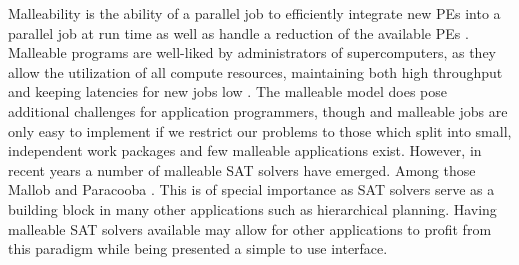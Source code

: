 \documentclass[enabledeprecatedfontcommands,12pt,a4paper,twoside]{scrartcl}
\numberwithin{equation}{section}
\begin{document}
\begin{comment}
- hierarchical planning is popular
- domain-independent automated planning
- decompose a set of initial tasks until they have been decomposed to the level of simple actions
- these actions form a plan which achieve the initial tasks
- TOHTN planning is a sub-problem of HTN planning where all tasks are constrained by a total order

- hierarchical planners are easy to use
- hierarchy allows the user to insert structure into the problem and advise the planner
- hierarchical planning is used in a number of domains
- \cite{munoz2004role} real-time strategy games\\
- \cite{ontanon2015adversarial} improve minimax game tree search in RTS, reduce branching factor
- \cite{lin2020htn} also takes the opponent's strategy into account

- \cite{sirin2004htn} web service composition
- \cite{georgievski2017cloud} cloud application composition

- \cite{gonzalez2017three} socially assistive robotics
- \cite{padia2018yarn} storyline visualizations
- \cite{mohr2018ml} automated machine learning

- hierarchical planning is expensive \cite{erol1994htn}
- HTN is semi-decidable, TOHTN is in D-EXPTIME, EXPSPACE-hard \cite{erol1996complexity}
- there is a correspondence between TOHTN and context free languages \cite{holler2014language}
- hierarchical problems can be recursive which makes the detection of duplicate states important
\end{comment}

Malleability is the ability of a parallel job to efficiently integrate new PEs into a parallel job at run time as well as handle a reduction of the available PEs \cite{feitelson1997job}. Malleable programs are well-liked by administrators of supercomputers, as they allow the utilization of all compute resources, maintaining both high throughput and keeping latencies for new jobs low \cite{feitelson1997job, hungershofer2004combined}. The malleable model does pose additional challenges for application programmers, though and malleable jobs are only easy to implement if we restrict our problems to those which split into small, independent work packages \cite{feitelson1997job, tucker1989process} and few malleable applications exist. 
However, in recent years a number of malleable SAT solvers have emerged. Among those Mallob \cite{sanders2022decentralized} and Paracooba \cite{heisinger2020distributed}. This is of special importance as SAT solvers serve as a building block in many other applications such as hierarchical planning. Having malleable SAT solvers available may allow for other applications to profit from this paradigm while being presented a simple to use interface. \\
\end{document}
